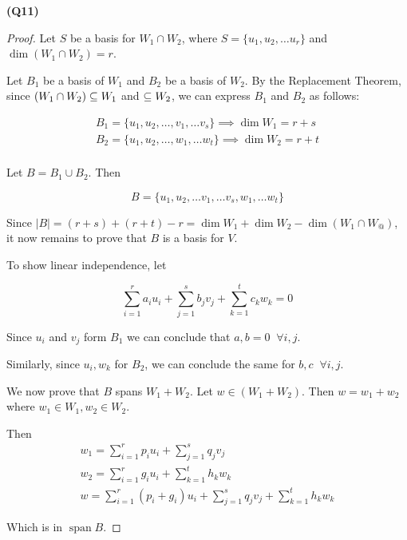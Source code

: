 \documentclass[12pt, a4paper]{article}
\begin{document}
\textbf{(Q11)}

\begin{proof}
    Let $S$ be a basis for $W_1 \cap W_2$, where
    $S = \{u_1, u_2, \ldots u_r\}$ and $\dim (W_1 \cap W_2) = r$.

    Let $B_1$ be a basis of $W_1$ and $B_2$ be a basis of $W_2$.
    By the Replacement Theorem, since $(W_1 \cap W_2) \subseteq W_1$ and $\subseteq W_2$,
    we can express $B_1$ and $B_2$ as follows:

    \begin{gather*}
        B_1 = \{u_1, u_2, \ldots, v_1, \ldots v_s\} \implies \dim W_1 = r + s\\
        B_2 = \{u_1, u_2, \ldots, w_1, \ldots w_t\} \implies \dim W_2 = r + t\\
    \end{gather*}

    Let $B = B_1 \cup B_2$. Then

    \[
        B = \{u_1, u_2, \ldots v_1, \ldots v_s, w_1, \ldots w_t\}
    \]

    Since $|B| = (r + s) + (r + t) - r = \dim W_1 + \dim W_2 - \dim (W_1 \cap W_@)$,
    it now remains to prove that $B$ is a basis for $V$.

    To show linear independence, let

    \[
        \sum_{i = 1}^{r} a_i u_i +
        \sum_{j = 1}^{s} b_j v_j +
        \sum_{k = 1}^{t} c_k w_k = 0
    \]

    Since $u_i$ and $v_j$ form $B_1$ we can conclude that
    $a, b = 0 \;\; \forall i, j$.

    Similarly, since $u_i, w_k$ for $B_2$, we can conclude the same for
    $b, c \;\; \forall i, j$.

    We now prove that $B$ spans $W_1 + W_2$. Let $w \in (W_1 + W_2)$.
    Then $w = w_1 + w_2$ where $w_1 \in W_1, w_2 \in W_2$.

    Then
    \begin{gather*}
        w_1 = \sum_{i = 1}^{r} p_i u_i + \sum_{j = 1}^{s} q_j v_j\\
        w_2 = \sum_{i = 1}^{r} g_i u_i + \sum_{k = 1}^{t} h_k w_k\\
        w = \sum_{i = 1}^{r} (p_i + g_i)u_i + \sum_{j = 1}^{s} q_j v_j
        + \sum_{k = 1}^{t} h_k w_k
    \end{gather*}

    Which is in $\operatorname{span} B$.

\end{proof}
\end{document}
